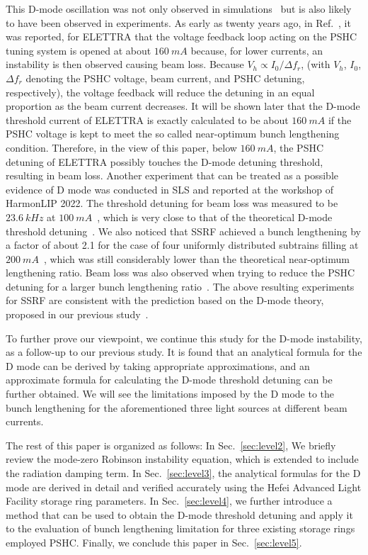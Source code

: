 \documentclass[%
 reprint,
 amsmath,amssymb,
 aps,
]{revtex4-1}
\begin{document}
This D-mode oscillation was not only observed in simulations~\cite{He06,Carmignani07,Gamelin08,Stingelin09} but is also likely to have been observed in experiments. As early as twenty years ago, in Ref.~\cite{Pedrozzi01}, it was reported, for ELETTRA that the voltage feedback loop acting on the PSHC tuning system is opened at about $\SI{160}{mA}$ because, for lower currents, an instability is then observed causing beam loss. Because $V_h\propto I_0 / \Delta f_r$, (with $V_h$, $I_0$, $\Delta f_r$ denoting the PSHC voltage, beam current, and PSHC detuning, respectively), the voltage feedback will reduce the detuning in an equal proportion as the beam current decreases. It will be shown later that the D-mode threshold current of ELETTRA is exactly calculated to be about $\SI{160}{mA}$ if the PSHC voltage is kept to meet the so called near-optimum bunch lengthening condition. Therefore, in the view of this paper, below $\SI{160}{mA}$, the PSHC detuning of ELETTRA possibly touches the D-mode detuning threshold, resulting in beam loss. Another experiment that can be treated as a possible evidence of D mode was conducted in SLS and reported at the workshop of HarmonLIP 2022. The threshold detuning for beam loss was measured to be $\SI{23.6}{kHz}$ at $\SI{100}{mA}$~\cite{Stingelin09}, which is very close to that of the theoretical D-mode threshold detuning~\cite{He06}. We also noticed that SSRF achieved a bunch lengthening by a factor of about 2.1 for the case of four uniformly distributed subtrains filling at $\SI{200}{mA}$~\cite{Zhang02}, which was still considerably lower than the theoretical near-optimum lengthening ratio. Beam loss was also observed when trying to reduce the PSHC detuning for a larger bunch lengthening ratio~\cite{Hou10}. The above resulting experiments for SSRF are consistent with the prediction based on the D-mode theory, proposed in our previous study~\cite{He06}. 

To further prove our viewpoint, we continue this study for the D-mode instability, as a follow-up to our previous study. It is found that an analytical formula for the D mode can be derived by taking appropriate approximations, and an approximate formula for calculating the D-mode threshold detuning can be further obtained. We will see the limitations imposed by the D mode to the bunch lengthening for the aforementioned three light sources at different beam currents.
 
The rest of this paper is organized as follows: In Sec.~\ref{sec:level2}, We briefly review the mode-zero Robinson instability equation, which is extended to include the radiation damping term. In Sec.~\ref{sec:level3}, the analytical formulas for the D mode are derived in detail and verified accurately using the Hefei Advanced Light Facility storage ring parameters. In Sec.~\ref{sec:level4}, we further introduce a method that can be used to obtain the D-mode threshold detuning and apply it to the evaluation of bunch lengthening limitation for three existing storage rings employed PSHC. Finally, we conclude this paper in Sec.~\ref{sec:level5}.
\end{document}
